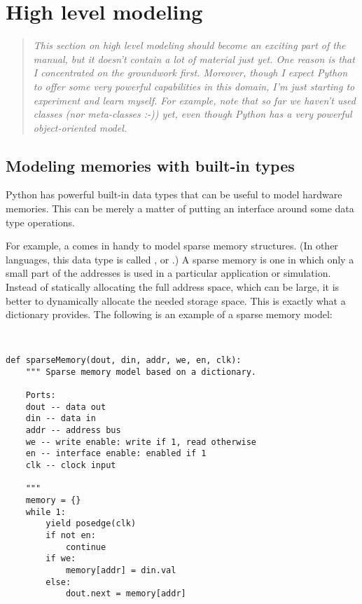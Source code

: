\section{High level modeling \label{model-hl}}

\begin{quote}
\em
This section on high level modeling should become an exciting part of
the manual, but it doesn't contain a lot of material just yet. One
reason is that I concentrated on the groundwork first. Moreover,
though I expect Python to offer some very powerful capabilities in
this domain, I'm just starting to experiment and learn myself. For
example, note that so far we haven't used classes (nor meta-classes
:-)) yet, even though Python has a very powerful object-oriented
model.
\end{quote}

\subsection{Modeling memories with built-in types \label{model-mem}}

Python has powerful built-in data types that can be useful to model
hardware memories. This can be merely a matter of putting an interface
around some data type operations.

For example, a  comes in handy to model sparse memory
structures. (In other languages, this data type is called 
, or .) A sparse memory is one in
which only a small part of the addresses is used in a particular
application or simulation. Instead of statically allocating the full
address space, which can be large, it is better to dynamically
allocate the needed storage space. This is exactly what a dictionary
provides. The following is an example of a sparse memory model:

\begin{verbatim}


def sparseMemory(dout, din, addr, we, en, clk):
    """ Sparse memory model based on a dictionary.

    Ports:
    dout -- data out
    din -- data in
    addr -- address bus
    we -- write enable: write if 1, read otherwise
    en -- interface enable: enabled if 1
    clk -- clock input
    
    """
    memory = {}
    while 1:
        yield posedge(clk)
        if not en:
            continue
        if we:
            memory[addr] = din.val
        else:
            dout.next = memory[addr]
\end{verbatim} 

